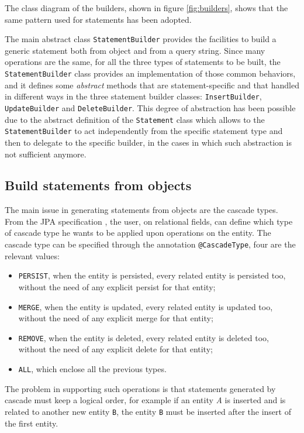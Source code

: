\noindent The class diagram of the builders, shown in figure \ref{fig:builders}, shows that the same pattern used for statements has been adopted.

\noindent The main abstract class \texttt{StatementBuilder} provides the facilities to build a generic statement both from object and from a query string.
Since many operations are the same, for all the three types of statements to be built, the \texttt{StatementBuilder} class provides an implementation of those common behaviors, and it defines some \textit{abstract} methods that are statement-specific and that handled in different ways in the three statement builder classes: \texttt{InsertBuilder}, \texttt{UpdateBuilder} and \texttt{DeleteBuilder}.
This degree of abstraction has been possible due to the abstract definition of the \texttt{Statement} class which allows to the \texttt{StatementBuilder} to act independently from the specific statement type and then to delegate to the specific builder, in the cases in which such abstraction is not sufficient anymore.

\subsection{Build statements from objects}
The main issue in generating statements from objects are the cascade types. From the JPA specification \cite{book:projpa2}, the user, on relational fields, can define which type of cascade type he wants to be applied upon operations on the entity. The cascade type can be specified through the annotation \texttt{@CascadeType}, four are the relevant values:
\begin{itemize}
\item \texttt{PERSIST}, when the entity is persisted, every related entity is persisted too, without the need of any explicit persist for that entity;
\item \texttt{MERGE}, when the entity is updated, every related entity is updated too, without the need of any explicit merge for that entity;
\item \texttt{REMOVE}, when the entity is deleted, every related entity is deleted too, without the need of any explicit delete for that entity;
\item \texttt{ALL}, which enclose all the previous types.
\end{itemize}

\noindent The problem in supporting such operations is that statements generated by cascade must keep a logical order, for example if an entity \textit{A} is inserted and is related to another new entity \texttt{B}, the entity \texttt{B} must be inserted after the insert of the first entity. 

